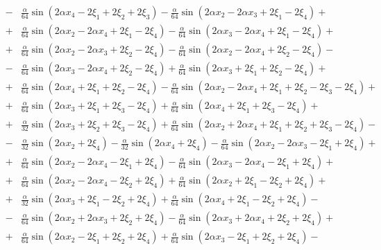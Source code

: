 \documentclass[11pt]{jfm}
\numberwithin{equation}{section}
\begin{document}
\begin{eqnarray}
&-&\frac{\alpha}{64}  \sin (2 \alpha x_4-2 \xi_1+2 \xi_2+2 \xi_3)-\frac{\alpha}{64}  \sin (2 \alpha x_2-2 \alpha x_3+2 \xi_1-2 \xi_4)+ \nonumber\\
&+&\frac{\alpha}{64}  \sin (2 \alpha x_2-2 \alpha x_4+2 \xi_1-2 \xi_4)-\frac{\alpha}{64}  \sin (2 \alpha x_3-2 \alpha x_4+2 \xi_1-2 \xi_4)+ \nonumber\\
&+&\frac{\alpha}{64}  \sin (2 \alpha x_2-2 \alpha x_3+2 \xi_2-2 \xi_4)-\frac{\alpha}{64}  \sin (2 \alpha x_2-2 \alpha x_4+2 \xi_2-2 \xi_4)- \nonumber\\
&-&\frac{\alpha}{64}  \sin (2 \alpha x_3-2 \alpha x_4+2 \xi_2-2 \xi_4)+\frac{\alpha}{64}  \sin (2 \alpha x_3+2 \xi_1+2 \xi_2-2 \xi_4)+ \nonumber\\
&\!+\!&\frac{\alpha}{64}  \sin (2 \alpha x_4\!+\!2 \xi_1\!+\!2 \xi_2\!-\!2 \xi_4)\!-\!\frac{\alpha}{64}  \sin (2 \alpha x_2\!-\!2 \alpha x_4\!+\!2 \xi_1\!+\!2 \xi_2\!-\!2 \xi_3\!-\!2 \xi_4)\!+\!\nonumber\\
&+&\frac{\alpha}{64}  \sin (2 \alpha x_3+2 \xi_1+2 \xi_3-2 \xi_4)+\frac{\alpha}{64}  \sin (2 \alpha x_4+2 \xi_1+2 \xi_3-2 \xi_4)+ \nonumber\\
&\!+\!&\frac{\alpha}{32}   \sin (2 \alpha x_3\!+\!2 \xi_2\!+\!2 \xi_3\!-\!2 \xi_4)\!+\!\frac{\alpha}{64}  \sin (2 \alpha x_2\!+\!2 \alpha x_4\!+\!2 \xi_1\!+\!2 \xi_2\!+\!2 \xi_3\!-\!2 \xi_4)\!-\!\nonumber\\
&\!-\!&\frac{\alpha}{32}   \sin (2 \alpha x_2\!+\!2 \xi_4)\!-\!\frac{\alpha}{32} \sin (2 \alpha x_4\!+\!2 \xi_4)\!-\!\frac{\alpha}{64}  \sin (2 \alpha x_2\!-\!2 \alpha x_3-2 \xi_1\!+\!2 \xi_4)\!+\!\nonumber\\
&+&\frac{\alpha}{64}  \sin (2 \alpha x_2-2 \alpha x_4-2 \xi_1+2 \xi_4)-\frac{\alpha}{64}  \sin (2 \alpha x_3-2 \alpha x_4-2 \xi_1+2 \xi_4)+ \nonumber\\
&+&\frac{\alpha}{64}  \sin (2 \alpha x_2-2 \alpha x_4-2 \xi_2+2 \xi_4)+\frac{\alpha}{64}  \sin (2 \alpha x_2+2 \xi_1-2 \xi_2+2 \xi_4)+ \nonumber\\
&+&\frac{\alpha}{32}   \sin (2 \alpha x_3+2 \xi_1-2 \xi_2+2 \xi_4)+\frac{\alpha}{64}  \sin (2 \alpha x_4+2 \xi_1-2 \xi_2+2 \xi_4)- \nonumber\\
&-&\frac{\alpha}{64}  \sin (2 \alpha x_2+2 \alpha x_3+2 \xi_2+2 \xi_4)-\frac{\alpha}{64}  \sin (2 \alpha x_3+2 \alpha x_4+2 \xi_2+2 \xi_4)+ \nonumber\\
&+&\frac{\alpha}{64}  \sin (2 \alpha x_2-2 \xi_1+2 \xi_2+2 \xi_4)+\frac{\alpha}{64}  \sin (2 \alpha x_3-2 \xi_1+2 \xi_2+2 \xi_4)- \nonumber\\

\end{eqnarray}
\end{document}
